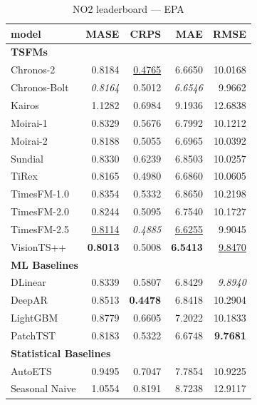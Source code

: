 \begin{table}[H]
\caption{NO2 leaderboard --- EPA}
\centering
\begin{small}
\begin{tabular}{lrrrr}
\toprule
model & MASE & CRPS & MAE & RMSE \\
\midrule
\multicolumn{5}{l}{\textbf{TSFMs}} \\
Chronos-2 & 0.8184 & \underline{0.4765} & 6.6650 & 10.0168 \\
Chronos-Bolt & \textit{0.8164} & 0.5012 & \textit{6.6546} & 9.9662 \\
Kairos & 1.1282 & 0.6984 & 9.1936 & 12.6838 \\
Moirai-1 & 0.8329 & 0.5676 & 6.7992 & 10.1212 \\
Moirai-2 & 0.8188 & 0.5055 & 6.6965 & 10.0392 \\
Sundial & 0.8330 & 0.6239 & 6.8503 & 10.0257 \\
TiRex & 0.8165 & 0.4980 & 6.6860 & 10.0605 \\
TimesFM-1.0 & 0.8354 & 0.5332 & 6.8650 & 10.2198 \\
TimesFM-2.0 & 0.8244 & 0.5095 & 6.7540 & 10.1727 \\
TimesFM-2.5 & \underline{0.8114} & \textit{0.4885} & \underline{6.6255} & 9.9045 \\
VisionTS++ & \textbf{0.8013} & 0.5008 & \textbf{6.5413} & \underline{9.8470} \\
\midrule
\multicolumn{5}{l}{\textbf{ML Baselines}} \\
DLinear & 0.8339 & 0.5807 & 6.8429 & \textit{9.8940} \\
DeepAR & 0.8513 & \textbf{0.4478} & 6.8418 & 10.2904 \\
LightGBM & 0.8779 & 0.6605 & 7.2022 & 10.1833 \\
PatchTST & 0.8183 & 0.5322 & 6.6748 & \textbf{9.7681} \\
\midrule
\multicolumn{5}{l}{\textbf{Statistical Baselines}} \\
AutoETS & 0.9495 & 0.7047 & 7.7854 & 10.9225 \\
Seasonal Naive & 1.0554 & 0.8191 & 8.7238 & 12.9117 \\
\bottomrule
\end{tabular}
\end{small}
\end{table}